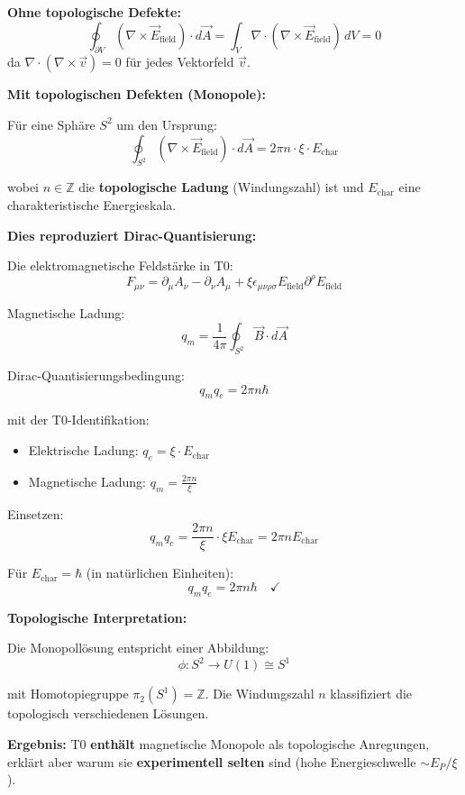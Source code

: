 	\textbf{Ohne topologische Defekte:}
	\[
	\oint_{\partial V} (\nabla \times \vec{E}_{\text{field}}) \cdot d\vec{A} = \int_V \nabla \cdot (\nabla \times \vec{E}_{\text{field}}) \, dV = 0
	\]
	da $\nabla \cdot (\nabla \times \vec{v}) = 0$ für jedes Vektorfeld $\vec{v}$.
	
	\textbf{Mit topologischen Defekten (Monopole):}
	
	Für eine Sphäre $S^2$ um den Ursprung:
	\[
	\oint_{S^2} (\nabla \times \vec{E}_{\text{field}}) \cdot d\vec{A} = 2\pi n \cdot \xi \cdot E_{\text{char}}
	\]
	
	wobei $n \in \mathbb{Z}$ die \textbf{topologische Ladung} (Windungszahl) ist und $E_{\text{char}}$ eine charakteristische Energieskala.
	
	\textbf{Dies reproduziert Dirac-Quantisierung:}
	
	Die elektromagnetische Feldstärke in T0:
	\[
	F_{\mu\nu} = \partial_\mu A_\nu - \partial_\nu A_\mu + \xi \epsilon_{\mu\nu\rho\sigma} E_{\text{field}} \partial^\rho E_{\text{field}}
	\]
	
	Magnetische Ladung:
	\[
	q_m = \frac{1}{4\pi} \oint_{S^2} \vec{B} \cdot d\vec{A}
	\]
	
	Dirac-Quantisierungsbedingung:
	\[
	q_m q_e = 2\pi n \hbar
	\]
	
	mit der T0-Identifikation:
	\begin{itemize}
		\item Elektrische Ladung: $q_e = \xi \cdot E_{\text{char}}$
		\item Magnetische Ladung: $q_m = \frac{2\pi n}{\xi}$
	\end{itemize}
	
	Einsetzen:
	\[
	q_m q_e = \frac{2\pi n}{\xi} \cdot \xi E_{\text{char}} = 2\pi n E_{\text{char}}
	\]
	
	Für $E_{\text{char}} = \hbar$ (in natürlichen Einheiten):
	\[
	\boxed{q_m q_e = 2\pi n \hbar} \quad \checkmark
	\]
	
	\textbf{Topologische Interpretation:}
	
	Die Monopollösung entspricht einer Abbildung:
	\[
	\phi: S^2 \to U(1) \cong S^1
	\]
	
	mit Homotopiegruppe $\pi_2(S^1) = \mathbb{Z}$. Die Windungszahl $n$ klassifiziert die topologisch verschiedenen Lösungen.
	
	\textbf{Ergebnis:} T0 \textbf{enthält} magnetische Monopole als topologische Anregungen, erklärt aber warum sie \textbf{experimentell selten} sind (hohe Energieschwelle $\sim E_P/\xi$).
	
